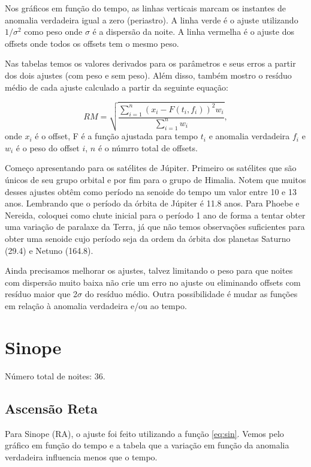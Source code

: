 \documentclass[11pt,a4paper]{report}
\begin{document}
Nos gráficos em função do tempo, as linhas verticais marcam os instantes de anomalia verdadeira igual a zero (periastro). A linha verde é o ajuste utilizando $1 / \sigma^{2}$ como peso onde $\sigma$ é a dispersão da noite. A linha vermelha é o ajuste dos offsets onde todos os offsets tem o mesmo peso.

Nas tabelas temos os valores derivados para os parâmetros e seus erros a partir dos dois ajustes (com peso e sem peso). Além disso, também mostro o resíduo médio de cada ajuste calculado a partir da seguinte equação:

\begin{equation}
RM = \sqrt{\frac{\sum\limits_{i=1}^{n}{(x_{i} - F(t_{i},f_{i}))^2}w_{i}}{\sum\limits_{i=1}^{n}{w}_{i}}},
\end{equation}
onde $x_{i}$ é o offset, F é a função ajustada para tempo $t_{i}$ e anomalia verdadeira $f_{i}$ e $w_{i}$ é o peso do offset $i$, $n$ é o númrro total de offsets.

Começo apresentando para os satélites de Júpiter. Primeiro os satélites que são únicos de seu grupo orbital e por fim para o grupo de Himalia. Notem que muitos desses ajustes obtêm como período na senoide do tempo um valor entre 10 e 13 anos. Lembrando que o período da órbita de Júpiter é 11.8 anos. Para Phoebe e Nereida, coloquei como chute inicial para o período 1 ano de forma a tentar obter uma variação de paralaxe da Terra, já que não temos observações suficientes para obter uma senoide cujo período seja da ordem da órbita dos planetas Saturno (29.4) e Netuno (164.8).

Ainda precisamos melhorar os ajustes, talvez limitando o peso para que noites com dispersão muito baixa não crie um erro no ajuste ou eliminando offsets com resíduo maior que 2$\sigma$ do resíduo médio. Outra possibilidade é mudar as funções em relação à anomalia verdadeira e/ou ao tempo.


\chapter*{Sinope}

\indent \indent Número total de noites: 36.

\section*{Ascensão Reta}

\indent \indent Para Sinope (RA), o ajuste foi feito utilizando a função \ref{eq:sin}. Vemos pelo gráfico em função do tempo e a tabela que a variação em função da anomalia verdadeira influencia menos que o tempo.\\
\end{document}
